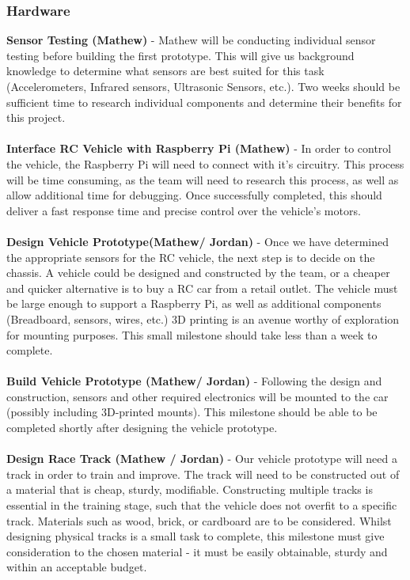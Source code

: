 \documentclass[8pt]{article}
\begin{document}
\subsubsection{Hardware}
\textbf{Sensor Testing (Mathew)} - Mathew will be conducting individual sensor testing before building the first prototype. This will give us background knowledge to determine what sensors are best suited for this task (Accelerometers, Infrared sensors, Ultrasonic Sensors, etc.). Two weeks should be sufficient time to research individual components and determine their benefits for this project.
\\\\
\textbf{Interface RC Vehicle with Raspberry Pi (Mathew)} - In order to control the vehicle, the Raspberry Pi will need to connect with it’s circuitry. This process will be time consuming, as the team will need to research this process, as well as allow additional time for debugging. Once successfully completed, this should deliver a fast response time and precise control over the vehicle’s motors.
\\\\
\textbf{Design Vehicle Prototype(Mathew/ Jordan)} - Once we have determined the appropriate sensors for the RC vehicle, the next step is to decide on the chassis. A vehicle could be designed and constructed by the team, or a cheaper and quicker alternative is to buy a RC car from a retail outlet. The vehicle must be large enough to support a Raspberry Pi, as well as additional components (Breadboard, sensors, wires, etc.) 3D printing is an avenue worthy of exploration for mounting purposes. This small milestone should take less than a week to complete.
\\\\
\textbf{Build Vehicle Prototype (Mathew/ Jordan)} - Following the design and construction, sensors and other required electronics will be mounted to the car (possibly including 3D-printed mounts). This milestone should be able to be completed shortly after designing the vehicle prototype.
\\\\
\textbf{Design Race Track (Mathew / Jordan)} - Our vehicle prototype will need a track in order to train and improve. The track will need to be constructed out of a material that is cheap, sturdy, modifiable. Constructing multiple tracks is essential in the training stage, such that the vehicle does not overfit to a specific track. Materials such as wood, brick, or cardboard are to be considered. Whilst designing physical tracks is a small task to complete, this milestone must give consideration to the chosen material - it must be easily obtainable, sturdy and within an acceptable budget.
\\\\
\end{document}
